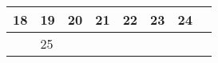 {\begin{tabularx}{\linewidth}{|l!{\vrule width \myLenLineThicknessThick}*{7}{@{}X@{}|}}
      
      
        \begin{minipage}[t]{6mm}\centering{}18\end{minipage}
      
       & 
    
      
      
        \begin{minipage}[t]{6mm}\centering{}19\end{minipage}
      
       & 
    
      
      
        \begin{minipage}[t]{6mm}\centering{}20\end{minipage}
      
       & 
    
      
      
        \begin{minipage}[t]{6mm}\centering{}21\end{minipage}
      
       & 
    
      
      
        \begin{minipage}[t]{6mm}\centering{}22\end{minipage}
      
       & 
    
      
      
        \begin{minipage}[t]{6mm}\centering{}23\end{minipage}
      
       & 
    
      
      
        \begin{minipage}[t]{6mm}\centering{}24\end{minipage}
      
      
        \\  \hline 
      
    
  
  
  
  \hyperlink{week-2027-4}{} &
    
      
      
        \begin{minipage}[t]{6mm}\centering{}25\end{minipage}
      

\end{tabularx}}
